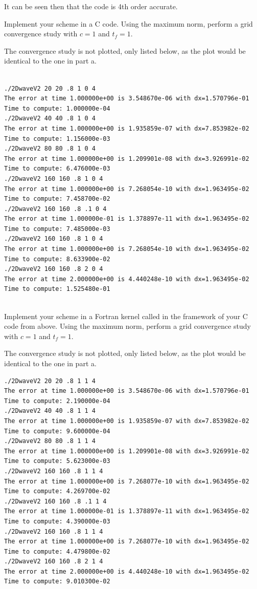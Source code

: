 It can be seen then that the code is 4th order accurate.

\item Implement your scheme in a C code. Using the maximum norm, perform a grid convergence study with $c=1$ and $t_f=1.$

The convergence study is not plotted, only listed below, as the plot would be identical to the one in part a.
\begin{lstlisting}[frame=single]

./2DwaveV2 20 20 .8 1 0 4
The error at time 1.000000e+00 is 3.548670e-06 with dx=1.570796e-01
Time to compute: 1.000000e-04
./2DwaveV2 40 40 .8 1 0 4
The error at time 1.000000e+00 is 1.935859e-07 with dx=7.853982e-02
Time to compute: 1.156000e-03
./2DwaveV2 80 80 .8 1 0 4
The error at time 1.000000e+00 is 1.209901e-08 with dx=3.926991e-02
Time to compute: 6.476000e-03
./2DwaveV2 160 160 .8 1 0 4
The error at time 1.000000e+00 is 7.268054e-10 with dx=1.963495e-02
Time to compute: 7.458700e-02
./2DwaveV2 160 160 .8 .1 0 4
The error at time 1.000000e-01 is 1.378897e-11 with dx=1.963495e-02
Time to compute: 7.485000e-03
./2DwaveV2 160 160 .8 1 0 4
The error at time 1.000000e+00 is 7.268054e-10 with dx=1.963495e-02
Time to compute: 8.633900e-02
./2DwaveV2 160 160 .8 2 0 4
The error at time 2.000000e+00 is 4.440248e-10 with dx=1.963495e-02
Time to compute: 1.525480e-01


\end{lstlisting}

\item Implement your scheme in a Fortran kernel called in the framework of your C code from above. Using the maximum norm, perform a grid convergence study with $c=1$ and $t_f=1.$

The convergence study is not plotted, only listed below, as the plot would be identical to the one in part a.

\begin{lstlisting}[frame=single]
./2DwaveV2 20 20 .8 1 1 4
The error at time 1.000000e+00 is 3.548670e-06 with dx=1.570796e-01
Time to compute: 2.190000e-04
./2DwaveV2 40 40 .8 1 1 4
The error at time 1.000000e+00 is 1.935859e-07 with dx=7.853982e-02
Time to compute: 9.600000e-04
./2DwaveV2 80 80 .8 1 1 4
The error at time 1.000000e+00 is 1.209901e-08 with dx=3.926991e-02
Time to compute: 5.623000e-03
./2DwaveV2 160 160 .8 1 1 4
The error at time 1.000000e+00 is 7.268077e-10 with dx=1.963495e-02
Time to compute: 4.269700e-02
./2DwaveV2 160 160 .8 .1 1 4
The error at time 1.000000e-01 is 1.378897e-11 with dx=1.963495e-02
Time to compute: 4.390000e-03
./2DwaveV2 160 160 .8 1 1 4
The error at time 1.000000e+00 is 7.268077e-10 with dx=1.963495e-02
Time to compute: 4.479800e-02
./2DwaveV2 160 160 .8 2 1 4
The error at time 2.000000e+00 is 4.440248e-10 with dx=1.963495e-02
Time to compute: 9.010300e-02


\end{lstlisting}

